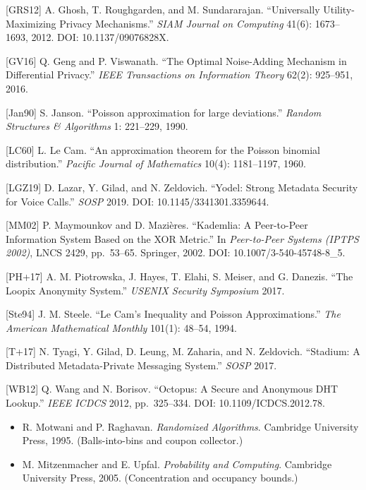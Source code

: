 \documentclass[
 11pt,
]{article}
\providecommand{\tightlist}{%
 \setlength{\itemsep}{0pt}\setlength{\parskip}{0pt}}
\begin{document}
{[}GRS12{]} A. Ghosh, T. Roughgarden, and M. Sundararajan. ``Universally
Utility-Maximizing Privacy Mechanisms.'' \emph{SIAM Journal on
Computing} 41(6): 1673--1693, 2012. DOI: 10.1137/09076828X.

{[}GV16{]} Q. Geng and P. Viswanath. ``The Optimal Noise-Adding
Mechanism in Differential Privacy.'' \emph{IEEE Transactions on
Information Theory} 62(2): 925--951, 2016.

{[}Jan90{]} S. Janson. ``Poisson approximation for large deviations.''
\emph{Random Structures \& Algorithms} 1: 221--229, 1990.

{[}LC60{]} L. Le Cam. ``An approximation theorem for the Poisson
binomial distribution.'' \emph{Pacific Journal of Mathematics} 10(4):
1181--1197, 1960.

{[}LGZ19{]} D. Lazar, Y. Gilad, and N. Zeldovich. ``Yodel: Strong
Metadata Security for Voice Calls.'' \emph{SOSP} 2019. DOI:
10.1145/3341301.3359644.

{[}MM02{]} P. Maymounkov and D. Mazières. ``Kademlia: A Peer-to-Peer
Information System Based on the XOR Metric.'' In \emph{Peer-to-Peer
Systems (IPTPS 2002)}, LNCS 2429, pp.~53--65. Springer, 2002. DOI:
10.1007/3-540-45748-8\_5.

{[}PH+17{]} A. M. Piotrowska, J. Hayes, T. Elahi, S. Meiser, and G.
Danezis. ``The Loopix Anonymity System.'' \emph{USENIX Security
Symposium} 2017.

{[}Ste94{]} J. M. Steele. ``Le Cam's Inequality and Poisson
Approximations.'' \emph{The American Mathematical Monthly} 101(1):
48--54, 1994.

{[}T+17{]} N. Tyagi, Y. Gilad, D. Leung, M. Zaharia, and N. Zeldovich.
``Stadium: A Distributed Metadata-Private Messaging System.''
\emph{SOSP} 2017.

{[}WB12{]} Q. Wang and N. Borisov. ``Octopus: A Secure and Anonymous DHT
Lookup.'' \emph{IEEE ICDCS} 2012, pp.~325--334. DOI:
10.1109/ICDCS.2012.78.

\begin{itemize}
\tightlist
\item
 R. Motwani and P. Raghavan. \emph{Randomized Algorithms}. Cambridge
 University Press, 1995. (Balls-into-bins and coupon collector.)
\item
 M. Mitzenmacher and E. Upfal. \emph{Probability and Computing}.
 Cambridge University Press, 2005. (Concentration and occupancy
 bounds.)
\end{itemize}
\end{document}
